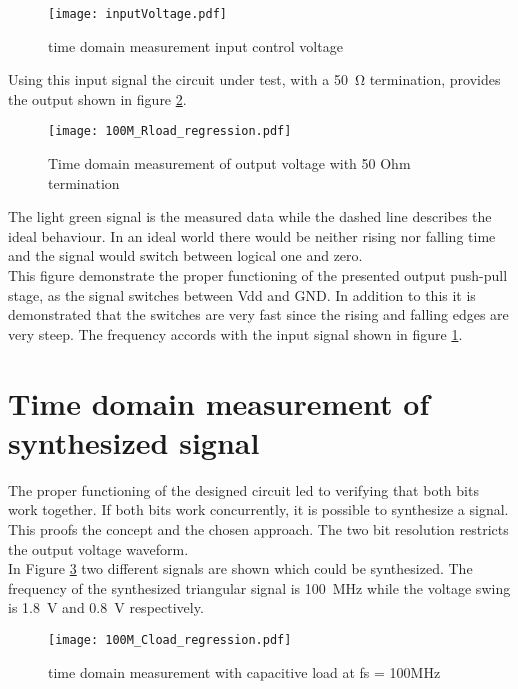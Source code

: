 \begin{figure}[htb!]
	\centering
  \texttt{[image: inputVoltage.pdf]}
	\caption{time domain measurement input control voltage}
	\label{fig:inputMeas}
\end{figure}


Using this input signal the circuit under test, with a \SI{50}{\ohm} termination, provides the output shown in figure \ref{fig:measRload100M}.


\begin{figure}[htb!]
	\centering
  \texttt{[image: 100M\_Rload\_regression.pdf]}
	\caption{Time domain measurement of output voltage with 50 Ohm termination}
	\label{fig:measRload100M}
\end{figure}

The light green signal is the measured data while the dashed line describes the ideal behaviour.
In an ideal world there would be neither rising nor falling time and the signal would switch between logical one and zero.\\
This figure demonstrate the proper functioning of the presented output push-pull stage, as the signal switches between Vdd and GND.
In addition to this it is demonstrated that the switches are very fast since the rising and falling edges are very steep.
The frequency accords with the input signal shown in figure \ref{fig:inputMeas}.


\section{Time domain measurement of synthesized signal}
The proper functioning of the designed circuit led to verifying that both bits work together.
If both bits work concurrently, it is possible to synthesize a signal.
This proofs the concept and the chosen approach.
The two bit resolution restricts the output voltage waveform.\\
In Figure \ref{fig:measCload100M} two different signals are shown which could be synthesized. 
The frequency of the synthesized triangular signal is \SI{100}{\mega \hertz} while the voltage swing is \SI{1.8}{\volt} and \SI{0.8}{\volt} respectively.

\begin{figure}[htb!]
	\centering
  \texttt{[image: 100M\_Cload\_regression.pdf]}
	\caption{time domain measurement with capacitive load at fs = 100MHz}
	\label{fig:measCload100M}
\end{figure}

